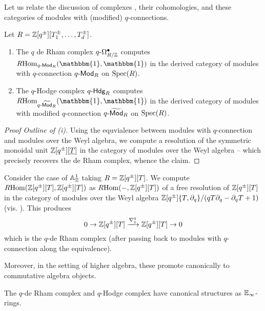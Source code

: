 Let us relate the discussion of complexes , their cohomologies, and these categories of modules with (modified) $q$-connections. 
\begin{proposition}\label{prop: algebra structures on RHom unit Ad and Gm}
    Let $R=\mathbb{Z}[q^{\pm}][T_{1}^{\pm},\dots,T_{d}^{\pm}]$.
    \begin{enumerate}[label=(\roman*)]
        \item The $q$ de Rham complex $q\text{-}\Omega^{\bullet}_{R/\mathbb{Z}}$ computes $R\Hom_{q\dash\Mod_{R}}(\mathbbm{1},\mathbbm{1})$ in the derived category of modules with $q$-connection $q\text{-}\mathsf{Mod}_{R}$ on $\operatorname{Spec}(R)$. 
        \item The $q$-Hodge complex $q\text{-}\mathsf{Hdg}_{R}$ computes $R\Hom_{q\dash\widetilde{\Mod}_{R}}(\mathbbm{1},\mathbbm{1})$ in the derived category of modules with modified $q$-connection $q\text{-}\widetilde{\mathsf{Mod}}_{R}$ on $\operatorname{Spec}(R)$. 
    \end{enumerate}
\end{proposition}
\begin{proof}[Proof Outline of (i)]
    Using the equvialence between modules with $q$-connection and modules over the Weyl algebra, we compute a resolution of the symmetric monoidal unit $\mathbb{Z}[q^{\pm}][\underline{T}]$ in the category of modules over the Weyl algebra -- which precisely recovers the de Rham complex, whence the claim. 
\end{proof}
\begin{example}
    Consider the case of $\mathbb{A}^{1}_{\mathbb{Z}}$ taking $R=\mathbb{Z}[q^{\pm}][T]$. We compute $R\mathrm{Hom}(\mathbb{Z}[q^{\pm}][T],\mathbb{Z}[q^{\pm}][T])$ as $R\mathrm{Hom}(-,\mathbb{Z}[q^{\pm}][T])$ of a free resolution of $\mathbb{Z}[q^{\pm}][T]$ in the category of modules over the Weyl algebra $\mathbb{Z}[q^{\pm}]\{T,\partial_{q}\}/(qT\partial_{q}-\partial_{q}T+1)$ (vis. ). This produces 
    $$0\to\mathbb{Z}[q^{\pm}][T]\xrightarrow{\nabla_{1}^{q}}\mathbb{Z}[q^{\pm}][T]\to0$$
    which is the $q$-de Rham complex (after passing back to modules with $q$-connection along the equivalence). 
\end{example}
Moreover, in the setting of higher algebra, these promote canonically to commutative algebra objects. 
\begin{corollary}
    The $q$-de Rham complex and $q$-Hodge complex have canonical structures as $\mathbb{E}_{\infty}$-rings. 
\end{corollary}